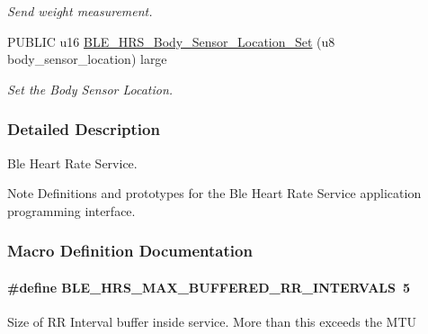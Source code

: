 \begin{DoxyCompactItemize}
\begin{DoxyCompactList}\small\item\em Send weight measurement. \end{DoxyCompactList}\item 
P\+U\+B\+L\+IC u16 \hyperlink{group___b_l_e___h_r_s_ga79b84a393e171afd8b42b6b219763216}{B\+L\+E\+\_\+\+H\+R\+S\+\_\+\+Body\+\_\+\+Sensor\+\_\+\+Location\+\_\+\+Set} (u8 body\+\_\+sensor\+\_\+location) large
\begin{DoxyCompactList}\small\item\em Set the Body Sensor Location. \end{DoxyCompactList}\end{DoxyCompactItemize}


\subsubsection{Detailed Description}
Ble Heart Rate Service. 

\begin{DoxyNote}{Note}
Definitions and prototypes for the Ble Heart Rate Service application programming interface. 
\end{DoxyNote}


\subsubsection{Macro Definition Documentation}
\paragraph[{\texorpdfstring{B\+L\+E\+\_\+\+H\+R\+S\+\_\+\+M\+A\+X\+\_\+\+B\+U\+F\+F\+E\+R\+E\+D\+\_\+\+R\+R\+\_\+\+I\+N\+T\+E\+R\+V\+A\+LS}{BLE_HRS_MAX_BUFFERED_RR_INTERVALS}}]{\setlength{\rightskip}{0pt plus 5cm}\#define B\+L\+E\+\_\+\+H\+R\+S\+\_\+\+M\+A\+X\+\_\+\+B\+U\+F\+F\+E\+R\+E\+D\+\_\+\+R\+R\+\_\+\+I\+N\+T\+E\+R\+V\+A\+LS~5}\hypertarget{group___b_l_e___h_r_s_ga2e829f32fd9d57d18d1e8daa7956dee5}{}\label{group___b_l_e___h_r_s_ga2e829f32fd9d57d18d1e8daa7956dee5}
Size of RR Interval buffer inside service. More than this exceeds the M\+TU 
